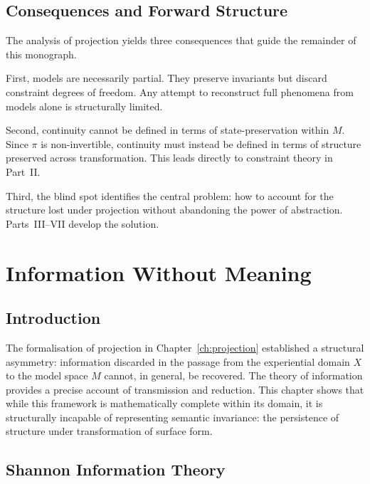 \documentclass[11pt,openany]{book}
\begin{document}
\section{Consequences and Forward Structure}
\label{sec:forward}

The analysis of projection yields three consequences that
guide the remainder of this monograph.

First, models are necessarily partial. They preserve
invariants but discard constraint degrees of freedom. Any
attempt to reconstruct full phenomena from models alone is
structurally limited.

Second, continuity cannot be defined in terms of
state-preservation within $M$. Since $\pi$ is
non-invertible, continuity must instead be defined in terms
of structure preserved across transformation. This leads
directly to constraint theory in Part~II.

Third, the blind spot identifies the central problem: how
to account for the structure lost under projection without
abandoning the power of abstraction. Parts~III--VII develop
the solution.




\chapter{Information Without Meaning}
\label{ch:information}

\section{Introduction}
\label{sec:introduction-information}

The formalisation of projection in Chapter~\ref{ch:projection}
established a structural asymmetry: information discarded in
the passage from the experiential domain $X$ to the model
space $M$ cannot, in general, be recovered. The theory of
information provides a precise account of transmission and
reduction. This chapter shows that while this framework is
mathematically complete within its domain, it is
structurally incapable of representing semantic invariance:
the persistence of structure under transformation of surface
form.

\section{Shannon Information Theory}
\label{sec:shannon}
\end{document}
